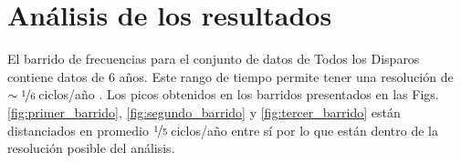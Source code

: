     \section{Análisis de los resultados}

    El barrido de frecuencias para el conjunto de datos de Todos los Disparos contiene datos de 6 años. Este rango de tiempo  permite tener una resolución de $\sim\nicefrac{1}{6}  \,$ciclos/año \cite{resolucion_barrido}. Los picos obtenidos en los barridos presentados en las Figs.\ref{fig:primer_barrido}, \ref{fig:segundo_barrido} y \ref{fig:tercer_barrido} están distanciados en promedio $\nicefrac{1}{5}\,$ciclos/año entre sí por lo que están dentro de la resolución posible del análisis. 


    


